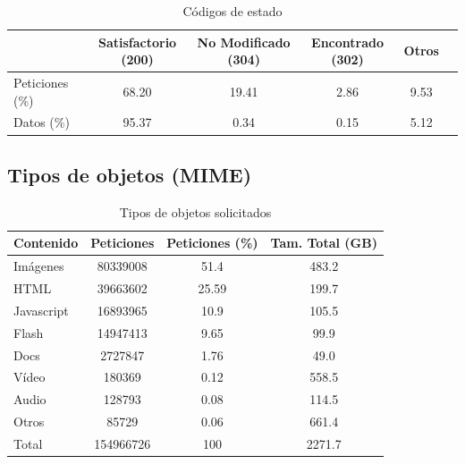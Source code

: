 \documentclass[twocolumn]{Jornadas}
\begin{document}
\begin{table}
\centering
\renewcommand{\baselinestretch}{1.5}
\scriptsize
\begin{tabular}{|l||c|c|c|c|c|} \hline
  & Satisfactorio (200) & No Modificado (304) & Encontrado (302) & Otros\\\hline\hline
Peticiones (\%)    & 68.20  & 19.41 & 2.86 & 9.53            \\\hline  
Datos (\%)        & 95.37   & 0.34 & 0.15 & 5.12             \\\hline 
\end{tabular}
\caption{Códigos de estado}
\label{table:codigos}
\end{table}


\subsection{Tipos de objetos (MIME)}
\label{mime}

\begin{table}
\centering
\renewcommand{\baselinestretch}{1.5}
\scriptsize
\begin{tabular}{|l||c|c|c|} \hline
Contenido   & Peticiones & Peticiones (\%) &Tam. Total (GB) \\\hline\hline
Imágenes    & 80339008   & 51.4 &483.2             \\\hline  
HTML        & 39663602   & 25.59 &199.7             \\\hline 
Javascript  & 16893965   & 10.9 &105.5             \\\hline 
Flash       & 14947413   & 9.65 & 99.9              \\\hline 
Docs  & 2727847    & 1.76 &49.0              \\\hline
Vídeo       & 180369     & 0.12 & 558.5             \\\hline 
Audio       & 128793     & 0.08 & 114.5             \\\hline 
Otros       & 85729      & 0.06 & 661.4             \\\hline\hline
Total & 154966726 & 100 & 2271.7 \\\hline
\end{tabular}
\caption{Tipos de objetos solicitados}
\label{table:contenido}
\end{table}
\end{document}
